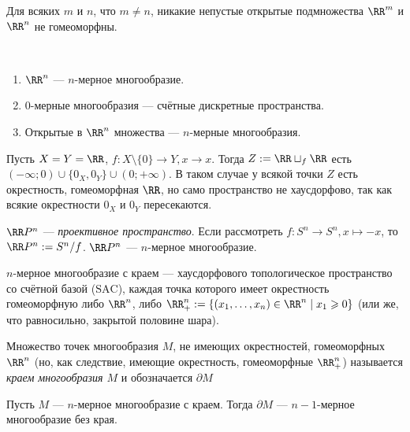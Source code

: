 \documentclass[12pt,a4paper]{article}
\newcommand{\SAC}{\ensuremath{\mathrm{SAC}}\xspace}
\begin{document}
    \begin{theorem}
        Для всяких $m$ и $n$, что $m \neq n$, никакие непустые открытые подмножества $\RR^m$ и $\RR^n$ не гомеоморфны.
    \end{theorem}

    \begin{example}\ 
        \begin{enumerate}
            \item $\RR^n$ --- $n$-мерное многообразие.
            \item $0$-мерные многообразия --- счётные дискретные пространства.
            \item Открытые в $\RR^n$ множества --- $n$-мерные многообразия.
        \end{enumerate}
    \end{example}

    \begin{example}
        Пусть $X = Y = \RR$, $f: X \setminus \{0\} \to Y, x \to x$. Тогда $Z := \RR \sqcup_f \RR$ есть $(-\infty; 0) \cup \{0_X, 0_Y\} \cup (0; +\infty)$. В таком случае у всякой точки $Z$ есть окрестность, гомеоморфная $\RR$, но само пространство не хаусдорфово, так как всякие окрестности $0_X$ и $0_Y$ пересекаются.
    \end{example}

    \begin{example}
        $\RR P^n$ --- \emph{проективное пространство}. Если рассмотреть $f: S^n \to S^n, x \mapsto -x$, то $\RR P^n := S^n/f$. $\RR P^n$ --- $n$-мерное многообразие.
    \end{example}

    \begin{definition}
        $n$-мерное многообразие с краем --- хаусдорфового топологическое пространство со счётной базой (\SAC), каждая точка которого имеет окрестность гомеоморфную либо $\RR^n$, либо $\RR^n_+ := \{(x_1, \dots, x_n) \in \RR^n \mid x_1 \geqslant 0\}$ (или же, что равносильно, закрытой половине шара).

        Множество точек многообразия $M$, не имеющих окрестностей, гомеоморфных $\RR^n$ (но, как следствие, имеющие окрестность, гомеоморфные $\RR^n_+$) называется \emph{краем многообразия $M$} и обозначается $\partial M$
    \end{definition}

    \begin{theorem}
        Пусть $M$ --- $n$-мерное многообразие с краем. Тогда $\partial M$ --- $n-1$-мерное многообразие без края.
    \end{theorem}
\end{document}
